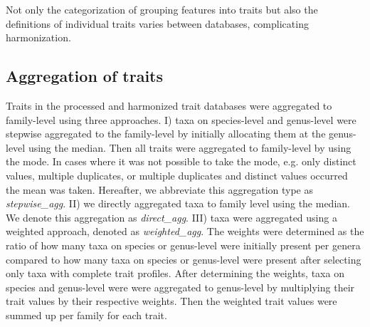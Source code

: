 \documentclass{article}
\begin{document}
Not only the categorization of grouping features into traits but also the definitions of individual traits varies between databases, complicating harmonization. 


\subsection{Aggregation of traits}

Traits in the processed and harmonized trait databases were aggregated to family-level using three approaches. I) taxa on species-level and genus-level were stepwise aggregated to the family-level by initially allocating them at the genus-level using the median. Then all traits were aggregated to family-level by using the mode. In cases where it was not possible to take the mode, e.g. only distinct values, multiple duplicates, or multiple duplicates and distinct values occurred the mean was taken. Hereafter, we abbreviate this aggregation type as \textit{stepwise\_agg}.
II) we directly aggregated taxa to family level using the median. We denote this aggregation as \textit{direct\_agg}. III) taxa were aggregated using a weighted approach, denoted as \textit{weighted\_agg}. The weights were determined as the ratio of how many taxa on species or genus-level were initially present per genera compared to how many taxa on species or genus-level were present after selecting only taxa with complete trait profiles. After determining the weights, taxa on species and genus-level were were aggregated to genus-level by multiplying their trait values by their respective weights. Then the weighted trait values were summed up per family for each trait.
\end{document}
